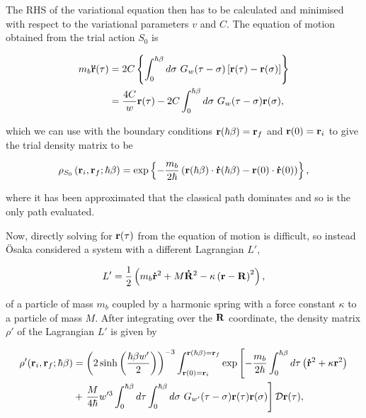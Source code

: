The RHS of the variational equation then has to be calculated and minimised with respect to the variational parameters $v$ and $C$. The equation of motion obtained from the trial action $S_0$ is

\begin{equation}
    \begin{aligned}
        m_b \vb{\ddot{r}}(\tau) &= 2C \left\{ \int^{\hbar\beta}_0 d\sigma\ G_w(\tau - \sigma) \left[ \vb{r}(\tau) - \vb{r}(\sigma) \right] \right\} \\
        &= \frac{4C}{w} \vb{r}(\tau) - 2C \int^{\hbar\beta}_0 d\sigma\ G_w(\tau - \sigma) \vb{r}(\sigma),
    \end{aligned}
\end{equation}

which we can use with the boundary conditions $\vb{r}(\hbar\beta) = \vb{r}_f$ and $\vb{r}(0) = \vb{r}_i$ to give the trial density matrix to be

\begin{equation}
    \rho_{S_0}\left(\vb{r}_i, \vb{r}_f; \hbar\beta\right) = \exp \left\{-\frac{m_b}{2\hbar}\left( \vb{r}(\hbar\beta) \cdot \vb{\dot{r}}(\hbar\beta) - \vb{r}(0) \cdot \vb{\dot{r}}(0) \right)\right\},
\end{equation}

where it has been approximated that the classical path dominates and so is the only path evaluated. 

Now, directly solving for $\vb{r}(\tau)$ from the equation of motion is difficult, so instead \"Osaka considered a system with a different Lagrangian $L'$,

\begin{equation}
    L' = \frac{1}{2} \left( m_b\vb{\dot{r}}^2 + M\vb{\dot{R}}^2 - \kappa \left( \vb{r} - \vb{R} \right)^2 \right),
\end{equation}

of a particle of mass $m_b$ coupled by a harmonic spring with a force constant $\kappa$ to a particle of mass $M$. After integrating over the $\vb{R}$ coordinate, the density matrix $\rho'$ of the Lagrangian $L'$ is given by

\begin{equation}
    \begin{aligned}
        \rho'(\vb{r}_i, \vb{r}_f; \hbar\beta) &= \left(2 \sinh\left(\frac{\hbar\beta w'}{2}\right)\right)^{-3} \int_{\vb{r}(0) = \vb{r}_i}^{\vb{r}(\hbar\beta) = \vb{r}_f} \exp \left[-\frac{m_b}{2\hbar} \int_0^{\hbar\beta} d\tau \left(\vb{\dot{r}}^2 + \kappa \vb{r}^2\right)\right. \\
        &+ \left.\frac{M}{4\hbar} w'^3 \int^{\hbar\beta}_0 d\tau \int^{\hbar\beta}_0 d\sigma\ G_{w'}(\tau - \sigma) \vb{r}(\tau) \vb{r}(\sigma) \right] \mathcal{D}\vb{r}(\tau),
    \end{aligned}
\end{equation}

